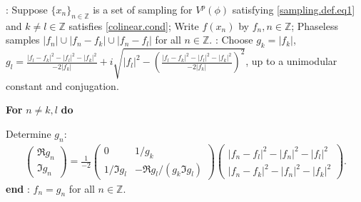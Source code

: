 \documentclass[12pt,oneside,reqno]{amsart}
\newcommand{\Z}{\mathbb{Z}}
\numberwithin{equation}{section}
\begin{document}
\begin{algorithm}[!ht]
	\renewcommand{\algorithmicrequire}{\textbf{Input:}}
	\renewcommand{\algorithmicensure}{\textbf{Output:}}
	\caption{Reconstruct $\{f(x_n)\}_{n\in \Z}$ in $V^p(\phi)$ from structured phaseless samples, up to a unimodular constant and conjugation}\label{alg2}
	
	\begin{algorithmic}[1]
		: Suppose $\{x_n\}_{n\in \Z}$ is a set of sampling for $V^p(\phi)$ satisfying \eqref{sampling.def.eq1} and $k\ne l\in \Z$ satisfies \eqref{colinear.cond}; Write $f(x_n)$ by $f_n, n\in \Z$; Phaseless samples $|f_n| \cup |f_{n} - f_k| \cup |f_{n} - f_l|$ for all $n\in \Z$.
		: Choose $g_k = |f_k|$, $ g_l= \frac{|f_l-f_k|^2 - |f_l|^2 - |f_k|^2}{-2{ |f_k|}} + i \sqrt{|f_l|^2 - (\frac{|f_l-f_k|^2 - |f_l|^2 - |f_k|^2}{-2{ |f_k|}})^2} $, up to a unimodular constant and conjugation.
		
		\State \textbf{For} $n\ne k,l$ \textbf{do}
		
		Determine $g_{n}$: 
		\begin{align*}
			\begin{pmatrix}
				\Re g_{n} \\
				\Im g_{n}
			\end{pmatrix}
			= \frac{1}{-2}  \begin{pmatrix}
				0  & 1/g_k \\
				1/\Im g_l & - \Re g_l / (g_k \Im g_l)
			\end{pmatrix}
			\begin{pmatrix}
				{|f_{n} - f_{l}|^2 - |f_{n}|^2 - |f_{l}|^2} \\
				{|f_{n} - f_{k}|^2 - |f_{n}|^2 - |f_{k}|^2}
			\end{pmatrix}.
		\end{align*} 
		\textbf{end}
		: $f_n=g_n$ for all $n\in \Z$.
	\end{algorithmic}
\end{algorithm}
\end{document}
